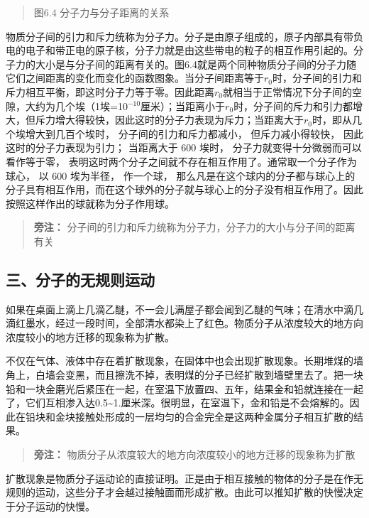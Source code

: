 \begin{quote}
图6.4 分子力与分子距离的关系
\end{quote}

物质分子间的引力和斥力统称为分子力。分子是由原子组成的，原子内部具有带负电的电子和带正电的原子核，分子力就是由这些带电的粒子的相互作用引起的。分子力的大小是与分子间的距离有关的。图6.4就是两个同种物质分子间的分子力随它们之间距离的变化而变化的函数图象。当分子间距离等于\(r_0\)时，分子间的引力和斥力相互平衡，即这时分子力等于零。因此距离\(r_{0}\)就相当于正常情况下分子间的空隙，大约为几个埃（1埃=10\(^{-10}\)厘米）；当距离小于\(r_{0}\)时，分子间的斥力和引力都增大，但斥力增大得较快，因此这时的分子力表现为斥力；当距离大于\(r_{0}\)时，即从几个埃增大到几百个埃时，
分子间的引力和斥力都减小， 但斥力减小得较快，
因此这时的分子力表现为引力； 当距离大于 600 埃时，
分子力就变得十分微弱而可以看作等于零，
表明这时两个分子之间就不存在相互作用了。通常取一个分子作为球心， 以 600
埃为半径， 作一个球，
那么凡是在这个球内的分子都与球心上的分子具有相互作用，而在这个球外的分子就与球心上的分子没有相互作用了。因此按照这样作出的球就称为分子作用球。

\begin{quote}
\textbf{旁注：}
分子间的引力和斥力统称为分子力，分子力的大小与分子间的距离有关
\end{quote}

\subsection{三、分子的无规则运动}\label{ux4e09ux5206ux5b50ux7684ux65e0ux89c4ux5219ux8fd0ux52a8}

如果在桌面上滴上几滴乙醚，不一会儿满屋子都会闻到乙醚的气味；在清水中滴几滴红墨水，经过一段时间，全部清水都染上了红色。物质分子从浓度较大的地方向浓度较小的地方迁移的现象称为扩散。

不仅在气体、液体中存在着扩散现象，在固体中也会出现扩散现象。长期堆煤的墙角上，白墙会变黑，而且擦洗不掉，表明煤的分子已经扩散到墙壁里去了。把一块铅和一块金磨光后紧压在一起，在室温下放置四、五年，结果金和铅就连接在一起了，它们互相渗入达0.5\textasciitilde1.厘米深。很明显，在室温下，金和铅是不会熔解的。因此在铅块和金块接触处形成的一层均匀的合金完全是这两种金属分子相互扩散的结果。

\begin{quote}
\textbf{旁注：}
物质分子从浓度较大的地方向浓度较小的地方迁移的现象称为扩散
\end{quote}

扩散现象是物质分子运动论的直接证明。正是由于相互接触的物体的分子是在作无规则的运动，这些分子才会越过接触面而形成扩散。由此可以推知扩散的快慢决定于分子运动的快慢。

